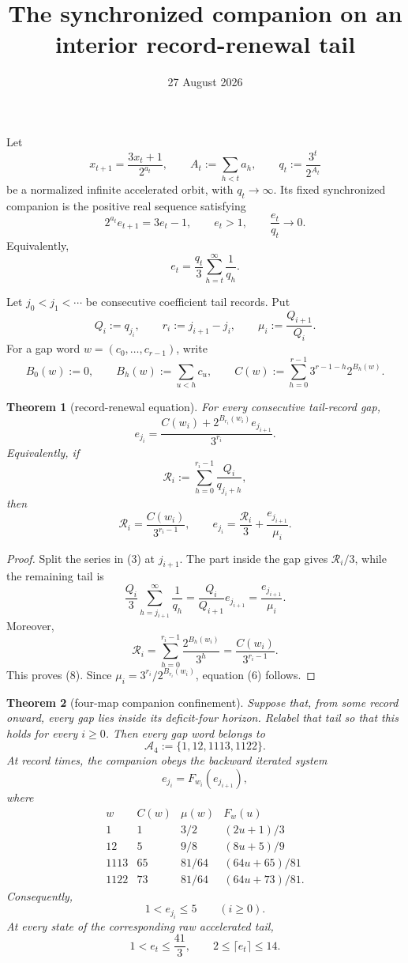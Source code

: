 \documentclass[11pt]{article}
\title{The synchronized companion on an interior record-renewal tail}
\author{}
\date{27 August 2026}
\newtheorem{theorem}{Theorem}
\begin{document}
\maketitle

Let
\[
  x_{t+1}=\frac{3x_t+1}{2^{a_t}},
  \qquad
  A_t:=\sum_{h<t}a_h,
  \qquad
  q_t:=\frac{3^t}{2^{A_t}}
  \tag{1}
\]
be a normalized infinite accelerated orbit, with $q_t\to\infty$.  Its
fixed synchronized companion is the positive real sequence satisfying
\[
  2^{a_t}e_{t+1}=3e_t-1,
  \qquad
  e_t>1,
  \qquad
  \frac{e_t}{q_t}\longrightarrow0.
  \tag{2}
\]
Equivalently,
\[
  e_t=\frac{q_t}{3}\sum_{h=t}^{\infty}\frac1{q_h}.
  \tag{3}
\]

Let $j_0<j_1<\cdots$ be consecutive coefficient tail records.  Put
\[
  Q_i:=q_{j_i},
  \qquad
  r_i:=j_{i+1}-j_i,
  \qquad
  \mu_i:=\frac{Q_{i+1}}{Q_i}.
  \tag{4}
\]
For a gap word $w=(c_0,\ldots,c_{r-1})$, write
\[
  B_0(w):=0,
  \qquad
  B_h(w):=\sum_{u<h}c_u,
  \qquad
  C(w):=\sum_{h=0}^{r-1}3^{r-1-h}2^{B_h(w)}.
  \tag{5}
\]

\begin{theorem}[record-renewal equation]
For every consecutive tail-record gap,
\[
  \boxed{
  e_{j_i}
  =\frac{C(w_i)+2^{B_{r_i}(w_i)}e_{j_{i+1}}}{3^{r_i}}.}
  \tag{6}
\]
Equivalently, if
\[
  \mathcal R_i
  :=\sum_{h=0}^{r_i-1}\frac{Q_i}{q_{j_i+h}},
  \tag{7}
\]
then
\[
  \boxed{
  \mathcal R_i=\frac{C(w_i)}{3^{r_i-1}},
  \qquad
  e_{j_i}=\frac{\mathcal R_i}{3}
             +\frac{e_{j_{i+1}}}{\mu_i}.}
  \tag{8}
\]
\end{theorem}

\begin{proof}
Split the series in (3) at $j_{i+1}$.  The part inside the gap gives
$\mathcal R_i/3$, while the remaining tail is
\[
  \frac{Q_i}{3}\sum_{h=j_{i+1}}^\infty\frac1{q_h}
  =\frac{Q_i}{Q_{i+1}}e_{j_{i+1}}
  =\frac{e_{j_{i+1}}}{\mu_i}.
\]
Moreover,
\[
  \mathcal R_i
  =\sum_{h=0}^{r_i-1}\frac{2^{B_h(w_i)}}{3^h}
  =\frac{C(w_i)}{3^{r_i-1}}.
\]
This proves (8).  Since
$\mu_i=3^{r_i}/2^{B_{r_i}(w_i)}$, equation (6) follows.
\end{proof}

\begin{theorem}[four-map companion confinement]
Suppose that, from some record onward, every gap lies inside its
deficit-four horizon.  Relabel that tail so that this holds for every
$i\geq0$.  Then every gap word belongs to
\[
  \mathcal A_4:=\{1,12,1113,1122\}.
  \tag{9}
\]
At record times, the companion obeys the backward iterated system
\[
  e_{j_i}=F_{w_i}(e_{j_{i+1}}),
  \tag{10}
\]
where
\[
\begin{array}{c|c|c|c}
  w&C(w)&\mu(w)&F_w(u)\\ \hline
  1&1&3/2&(2u+1)/3\\[1mm]
  12&5&9/8&(8u+5)/9\\[1mm]
  1113&65&81/64&(64u+65)/81\\[1mm]
  1122&73&81/64&(64u+73)/81.
\end{array}
\tag{11}
\]
Consequently,
\[
  \boxed{1<e_{j_i}\leq5\qquad(i\geq0).}
  \tag{12}
\]
At every state of the corresponding raw accelerated tail,
\[
  \boxed{1<e_t\leq\frac{41}{3},
  \qquad 2\leq \lceil e_t\rceil\leq14.}
  \tag{13}
\]
\end{theorem}
\end{document}
